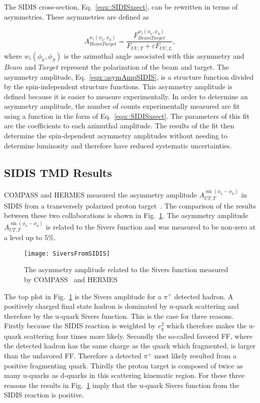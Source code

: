 The SIDIS cross-section, Eq.~\ref{equ::SIDISxsect}, can be rewritten in terms of
asymmetries.  These asymmetries are defined as

\begin{equation}
  A^{w_i(\phi_h, \phi_S)}_{BeamTarget} = \frac{F^{w_i(\phi_h,
      \phi_S)}_{BeamTarget}}{F_{UU,T}+\varepsilon F_{UU,L}},
  \label{equ::asymAmpSIDIS}
\end{equation}
\noindent
where $w_i(\phi_h, \phi_S)$ is the azimuthal angle associated with this
asymmetry and $Beam$ and $Target$ represent the polarization of the beam and
target.  The asymmetry amplitude, Eq.~\ref{equ::asymAmpSIDIS}, is a structure
function divided by the spin-independent structure functions.  This asymmetry
amplitude is defined because it is easier to measure experimentally.
In order to determine an asymmetry amplitude, the number of counts
experimentally measured are fit using a function in the form of
Eq.~\ref{equ::SIDISxsect}.  The parameters of this fit are the coefficients to
each azimuthal amplitude.  The results of the fit then determine the
spin-dependent asymmetry amplitudes without needing to determine luminosity and
therefore have reduced systematic uncertainties.

\subsection{SIDIS TMD Results}
COMPASS and HERMES measured the asymmetry amplitude $A_{UT
  ,T}^{\sin\left(\phi_h -\phi_S\right)}$ in SIDIS from a transversely polarized
proton target~\cite{Alekseev:2008aa,Airapetian:2009ae}.  The comparison of the
results between these two collaborations is shown in
Fig.~\ref{fig::SiversFromSIDIS}.  The asymmetry amplitude $A_{UT
  ,T}^{\sin\left(\phi_h-\phi_S\right)}$ is related to the Sivers function and
was measured to be non-zero at a level up to 5\%.

\begin{figure}[h!t]
  \centering \texttt{[image: SiversFromSIDIS]}
  \caption{The asymmetry amplitude related to the Sivers function measured by
    COMPASS~\cite{Alekseev:2008aa} and HERMES~\cite{Airapetian:2009ae}}
  \label{fig::SiversFromSIDIS}
\end{figure}

The top plot in Fig.~\ref{fig::SiversFromSIDIS} is the Sivers amplitude for a
$\pi^+$ detected hadron.  A positively charged final state hadron is dominated
by u-quark scattering and therefore by the u-quark Sivers function.  This is the
case for three reasons.  Firstly because the SIDIS reaction is weighted by
$e_q^2$ which therefore makes the u-quark scattering four times more likely.
Secondly the so-called favored FF, where the detected hadron has the same charge
as the quark which fragmented, is larger than the unfavored FF.  Therefore a
detected $\pi^+$ most likely resulted from a positive fragmenting quark.
Thirdly the proton target is composed of twice as many u-quarks as d-quarks in
this scattering kinematic region.  For these three reasons the results in
Fig.~\ref{fig::SiversFromSIDIS} imply that the u-quark Sivers function from the
SIDIS reaction is positive.

